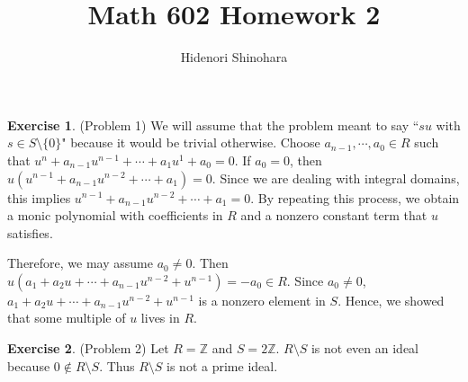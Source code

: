 \documentclass[12pt, psamsfonts]{amsart}
\theoremstyle{definition}
\newtheorem*{exer}{Exercise}
\theoremstyle{remark}
\numberwithin{equation}{section}
\begin{document}
\title{Math 602 Homework 2}
\author{Hidenori Shinohara}
\maketitle

\begin{exer}{(Problem 1)}
  We will assume that the problem meant to say ``$su$ with $s \in S \setminus \{ 0 \}$" because it would be trivial otherwise.
  Choose $a_{n - 1}, \cdots, a_0 \in R$ such that $u^n + a_{n - 1}u^{n - 1} + \cdots + a_1u^1 + a_0 = 0$.
  If $a_0 = 0$, then $u(u^{n - 1} + a_{n - 1}u^{n - 2} + \cdots + a_1) = 0$.
  Since we are dealing with integral domains, this implies $u^{n - 1} + a_{n - 1}u^{n - 2} + \cdots + a_1 = 0$.
  By repeating this process, we obtain a monic polynomial with coefficients in $R$ and a nonzero constant term that $u$ satisfies.

  Therefore, we may assume $a_0 \ne 0$.
  Then $u(a_1 + a_2u + \cdots + a_{n - 1}u^{n - 2} + u^{n - 1}) = -a_0 \in R$.
  Since $a_0 \ne 0$, $a_1 + a_2u + \cdots + a_{n - 1}u^{n - 2} + u^{n - 1}$ is a nonzero element in $S$.
  Hence, we showed that some multiple of $u$ lives in $R$.
\end{exer}

\begin{exer}{(Problem 2)}
  Let $R = \mathbb{Z}$ and $S = 2\mathbb{Z}$.
  $R \setminus S$ is not even an ideal because $0 \notin R \setminus S$.
  Thus $R \setminus S$ is not a prime ideal.
\end{exer}
\end{document}

